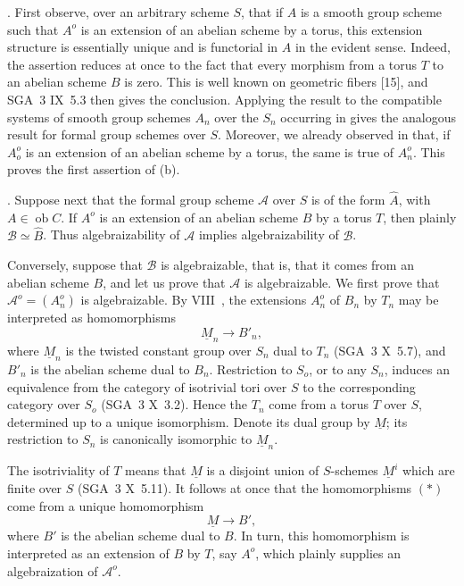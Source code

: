 \medskip
\noindent
{}. First observe, over an arbitrary scheme $S$, that if $A$ is
a smooth group scheme such that $A^o$ is an extension of an abelian
scheme by a torus, this extension structure is essentially unique and
is functorial in $A$ in the evident sense.  Indeed, the assertion
reduces at once to the fact that every morphism from a torus $T$ to an
abelian scheme $B$ is zero.  This is well known on geometric fibers
[15], and SGA~3 IX~5.3 then gives the conclusion.  Applying the result
to the compatible systems of smooth group schemes $A_n$ over the
$S_n$ occurring in  gives the analogous result for formal group
schemes over $S$.  Moreover, we already observed in  that, if
$A_o^o$ is an extension of an abelian scheme by a torus, the same is
true of $A_n^o$.  This proves the first assertion of (b).

\medskip
\noindent
{}. Suppose next that the formal group scheme $\mathcal A$ over
$S$ is of the form $\widehat A$, with $A\in\operatorname{ob}C$.  If
$A^o$ is an extension of an abelian scheme $B$ by a torus $T$, then
plainly $\mathcal B\simeq\widehat B$.  Thus algebraizability of
$\mathcal A$ implies algebraizability of $\mathcal B$.

Conversely, suppose that $\mathcal B$ is algebraizable, that is, that
it comes from an abelian scheme $B$, and let us prove that $\mathcal A$
is algebraizable.  We first prove that
$\mathcal A^o=(A_n^o)$ is algebraizable.  By VIII~, the extensions
$A_n^o$ of $B_n$ by $T_n$ may be interpreted as homomorphisms
\begin{equation}\tag{*}
 \underline M_n\longrightarrow B'_n,
\end{equation}
where $\underline M_n$ is the twisted constant group over $S_n$ dual
to $T_n$ (SGA~3 X~5.7), and $B'_n$ is the abelian scheme dual to
$B_n$.  Restriction to $S_o$, or to any $S_n$, induces an equivalence
from the category of isotrivial tori over $S$ to the corresponding
category over $S_o$ (SGA~3 X~3.2).  Hence the $T_n$ come from a torus
$T$ over $S$, determined up to a unique isomorphism.  Denote its dual
group by $\underline M$; its restriction to $S_n$ is canonically
isomorphic to $\underline M_n$.

The isotriviality of $T$ means that $\underline M$ is a disjoint union
of $S$-schemes $\underline M^i$ which are finite over $S$
(SGA~3 X~5.11).  It follows at once that the homomorphisms $(*)$ come
from a unique homomorphism
\begin{equation}\tag{**}
 \underline M\longrightarrow B',
\end{equation}
where $B'$ is the abelian scheme dual to $B$.  In turn, this
homomorphism is interpreted as an extension of $B$ by $T$, say $A^o$,
which plainly supplies an algebraization of $\mathcal A^o$.

